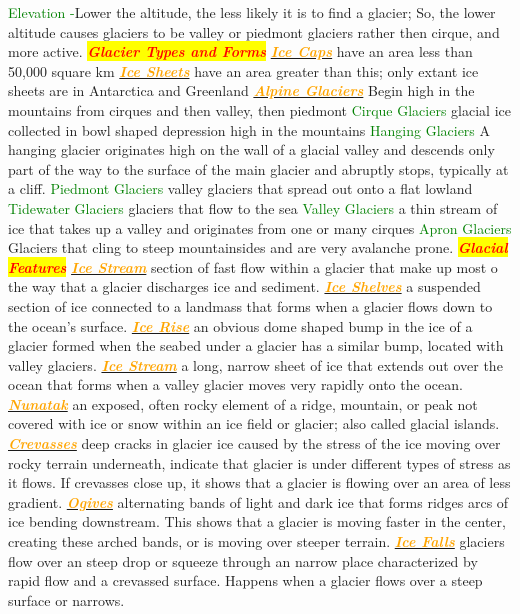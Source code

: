 \documentclass{article}
\newcommand{\red}[1]{\textcolor{red}{#1}}
\newcommand{\green}[1]{\textcolor{green}{#1}}
\newcommand{\orange}[1]{\textcolor{orange}{#1}}
\newcommand{\mysection}[1]{\colorbox{yellow}{\textbf{\textit{\red{#1}}}}}
\newcommand{\mysub}[1]{\underline{\textbf{{\textit{\orange{#1}}}}}}
\newcommand{\mysubsub}[1]{{{\green{#1}}}}
\begin{document}
\begin{multicols*}{4}
		\mysubsub{Elevation -}Lower the altitude, the less likely it is to find a glacier; So, the lower altitude causes glaciers to be valley or piedmont glaciers rather then cirque, and more active.
		\mysection{Glacier Types and Forms}
		\mysub{Ice Caps} have an area less than 50,000 square km
		\mysub{Ice Sheets} have an area greater than this; only extant ice sheets are in Antarctica and Greenland
		\mysub{Alpine Glaciers} Begin high in the mountains from cirques and then valley, then piedmont
		\mysubsub{Cirque Glaciers} glacial ice collected in bowl shaped depression high in the mountains 
		\mysubsub{Hanging Glaciers}  A hanging glacier originates high on the wall of a glacial valley and descends only part of the way to the surface of the main glacier and abruptly stops, typically at a cliff.
		\mysubsub{Piedmont Glaciers} valley glaciers that spread out onto a flat lowland
		\mysubsub{Tidewater Glaciers} glaciers that flow to the sea
		\mysubsub{Valley Glaciers} a thin stream of ice that takes up a valley and originates from one or many cirques
		\mysubsub{Apron Glaciers} Glaciers that cling to steep mountainsides and are very avalanche prone.
	    \mysection{Glacial Features}  
	    \mysub{Ice Stream} section of fast flow within a glacier that make up most o the way that a glacier discharges ice and sediment.
		\mysub{Ice Shelves} a suspended section of ice connected to a landmass that forms when a glacier flows down to the ocean’s surface.
		\mysub{Ice Rise} an obvious dome shaped bump in the ice of a glacier formed when the seabed under a glacier has a similar bump, located with valley glaciers.
		\mysub{Ice Stream} a long, narrow sheet of ice that extends out over the ocean that forms when a valley glacier moves very rapidly onto the ocean.
		\mysub{Nunatak} an exposed, often rocky element of a ridge, mountain, or peak not covered with ice or snow within an ice field or glacier; also called glacial islands.
		\mysub{Crevasses} deep cracks in glacier ice caused by the stress of the ice moving over rocky terrain underneath, indicate that glacier is under different types of stress as it flows. If crevasses close up, it shows that a glacier is flowing over an area of less gradient. 
		\mysub{Ogives} alternating bands of light and dark ice that forms ridges arcs of ice bending downstream. This shows that a glacier is moving faster in the center, creating these arched bands, or is moving over steeper terrain.
		\mysub{Ice Falls} glaciers flow over an steep drop or squeeze through an narrow place characterized by rapid flow and a crevassed surface. Happens when a glacier flows over a steep surface or narrows.

\end{multicols*}
\end{document}
